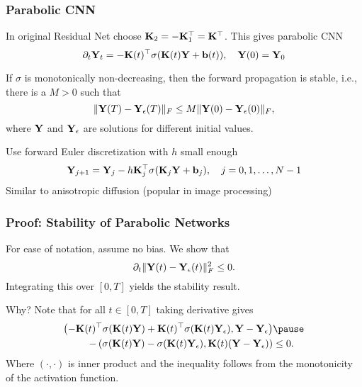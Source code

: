 \documentclass[12pt,fleqn,handout]{beamer}
\begin{document}
\begin{frame}
	\frametitle{Parabolic CNN}

		In original Residual Net choose ${\bf K}_2 = - {\bf K}_1^\top = {\bf K}^\top$.
		This gives parabolic CNN
		$$
		 \partial_t {\bf Y}_{t} = -{\bf K}(t)^{\top} \sigma({\bf K}(t) {\bf Y}  + {\bf b}(t)), \quad {\bf Y}(0) = {\bf Y}_0 
		$$
		
	 \pause
	
	\begin{theorem}
	    If $\sigma$ is monotonically non-decreasing, then the forward propagation is stable, i.e., there is a $M>0$ such that
	    \begin{equation*}
	        \|{\bf Y}(T) - {\bf Y}_{\epsilon}(T)\|_F \leq M \|{\bf Y}(0) - {\bf Y}_{\epsilon}(0)\|_F,
	    \end{equation*}
	    where ${\bf Y}$ and ${\bf Y}_{\epsilon}$ are solutions for different initial values.
	\end{theorem}
		
	 	Use forward Euler discretization with $h$ small enough
	 	\begin{equation*}
	 		{\bf Y}_{j+1} = {\bf Y}_{j}-h{\bf K}_j^{\top} \sigma({\bf K}_j {\bf Y}  + {\bf b}_j), \quad j=0,1,\ldots,N-1
	 	\end{equation*}
	 	Similar to anisotropic diffusion (popular in image processing)~\cite{ChenPock2017}
\end{frame}

\begin{frame}
	\frametitle{Proof: Stability of Parabolic Networks}
	

	    For ease of notation,  assume no bias.
		We show that 
			    \begin{equation*}
			        \partial_t \|{\bf Y}(t) - {\bf Y}_{\epsilon}(t)\|_F^2 \leq 0.
			    \end{equation*}
		Integrating this over $[0,T]$ yields the stability result.
		
		\pause
	    Why? Note that for all $t \in [0,T]$ taking derivative gives
	    \begin{eqnarray*}
			\left( -\bfK(t)^\top \sigma(\bfK(t) \bfY) + \bfK(t)^\top\sigma(\bfK(t) \bfY_\epsilon),  \bfY- \bfY_{\epsilon}\right)& \pause\\
	         -\left( \sigma(\bfK(t) \bfY) - \sigma(\bfK(t) \bfY_\epsilon),  \bfK(t) (\bfY- \bfY_{\epsilon}) \right)
	        & \leq  0.
	    \end{eqnarray*}
	    Where $(\cdot,\cdot)$ is inner product and the inequality follows from the monotonicity of the activation function.
	
\end{frame}
\end{document}
